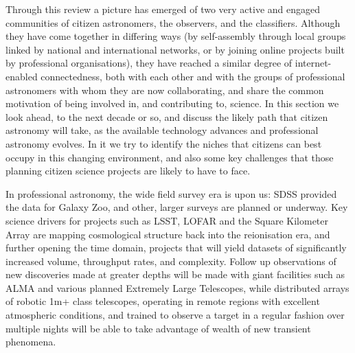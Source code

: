 \documentclass{ar2e}
\begin{document}


Through this review a picture has emerged of two very active and engaged
communities of citizen astronomers, the observers, and the classifiers. 
Although they have come together in differing ways (by self-assembly through
local groups linked by national and international networks, or by joining online
projects built by professional organisations), they have reached a similar
degree of internet-enabled connectedness, both with each other and with the
groups of professional astronomers with whom they are now collaborating, and
share the common motivation of being involved in, and contributing to, science.
In this section we look ahead, to the next decade or so, and discuss the likely
path that citizen astronomy will take, as the available technology advances and
professional astronomy evolves. In it we try to identify the niches that
citizens can best occupy in this changing environment, and also some key
challenges that those planning citizen science projects are likely to have to
face.




In professional astronomy, the wide field survey era is upon us: SDSS provided
the data for Galaxy Zoo, and other, larger surveys are planned or underway. Key
science drivers for projects such as LSST, LOFAR and the Square Kilometer Array
are mapping cosmological structure back into the reionisation era, and  further
opening the time domain, projects that will yield datasets of significantly
increased volume, throughput rates, and complexity.  Follow up observations of
new discoveries made at greater depths will be made with giant facilities such
as ALMA and various planned Extremely Large Telescopes, while distributed arrays
of robotic 1m+ class telescopes, operating in remote regions with excellent
atmospheric conditions, and trained to observe a target in a regular fashion
over multiple nights will be able to take advantage of wealth of new transient
phenomena. 
\end{document}
